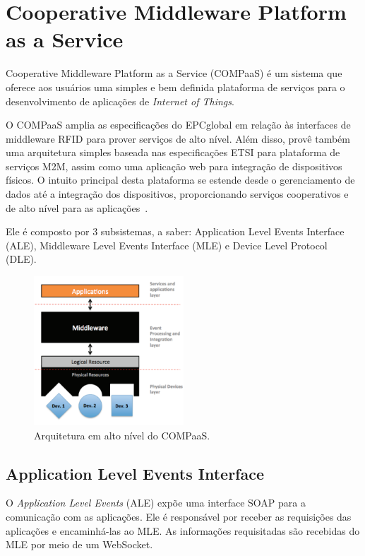 \section{Cooperative Middleware Platform as a Service}
\label{sec:COMPaaS}
Cooperative Middleware Platform as a Service (COMPaaS) é um sistema que oferece aos usuários uma simples e bem
definida plataforma de serviços para o desenvolvimento de aplicações de \textit{Internet of Things}.

O COMPaaS amplia as especificações do EPCglobal em relação às interfaces de middleware RFID para
prover serviços de alto nível. Além disso, provê também uma arquitetura simples baseada nas especificações
ETSI para plataforma de serviços M2M, assim como uma aplicação web para integração de dispositivos físicos.
O intuito principal desta plataforma se estende desde o gerenciamento de dados até a integração dos
dispositivos, proporcionando serviços cooperativos e de alto nível para as aplicações~\cite{COMPaaS}.

Ele é composto por 3 subsistemas, a saber:  Application Level Events
Interface (ALE), Middleware Level Events Interface (MLE) e Device Level Protocol (DLE).

\begin{figure}[H]
	\centering
		\includegraphics[width=0.5\textwidth]{fig/compaas_arch.png}
	\caption{Arquitetura em alto nível do COMPaaS.}
\end{figure}

\subsection{Application Level Events Interface}
O \textit{Application Level Events} (ALE) expõe uma interface SOAP para a comunicação com as aplicações.
Ele é responsável por receber as requisições das aplicações e encaminhá-las ao MLE. As informações
requisitadas são recebidas do MLE por meio de um WebSocket.

